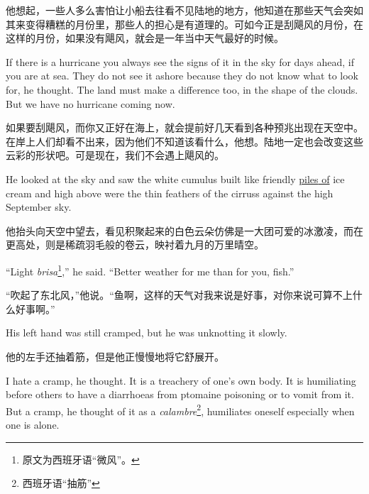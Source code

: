 \begin{paracol}{2}
\switchcolumn

他想起，一些人多么害怕让小船去往看不见陆地的地方，他知道在那些天气会突如其来变得糟糕的月份里，那些人的担心是有道理的。可如今正是刮飓风的月份，在这样的月份，如果没有飓风，就会是一年当中天气最好的时候。

\switchcolumn*

If there is a hurricane you always see the signs of it in the sky for days
ahead, if you are at sea. They do not see it \gls{ashore} because they do not know
what to look for, he thought. The land must make a difference too, in the
shape of the clouds. But we have no hurricane coming now.

\switchcolumn

如果要刮飓风，而你又正好在海上，就会提前好几天看到各种预兆出现在天空中。在岸上人们却看不出来，因为他们不知道该看什么，他想。陆地一定也会改变这些云彩的形状吧。可是现在，我们不会遇上飓风的。

\switchcolumn*

He looked at the sky and saw the white \gls{cumulus} built like friendly
\uline{\glspl{pile} of} ice cream and high above were the thin \glspl{feather} of
the \glspl{cirrus} against the high September sky.

\switchcolumn

他抬头向天空中望去，看见积聚起来的白色云朵仿佛是一大团可爱的冰激凌，而在更高处，则是稀疏羽毛般的卷云，映衬着九月的万里晴空。

\switchcolumn*

``Light \emph{brisa}\footnote{原文为西班牙语“微风”。},'' he said. ``Better
weather for me than for you, fish.''

\switchcolumn

“吹起了东北风，”他说。“鱼啊，这样的天气对我来说是好事，对你来说可算不上什么好事啊。”

\switchcolumn*

His left hand was still cramped, but he was \gls{unknotting} it slowly.

\switchcolumn

他的左手还抽着筋，但是他正慢慢地将它舒展开。

\switchcolumn*

I hate a cramp, he thought. It is a treachery of one's own body. It is
\gls{humiliating} before others to have a \glspl{diarrhoea} from
\gls{ptomaine} poisoning or to \gls{vomit} from it. But a cramp, he
thought of it as a \emph{calambre}\footnote{西班牙语“抽筋”}, humiliates oneself
especially when one is alone.


\end{paracol}
